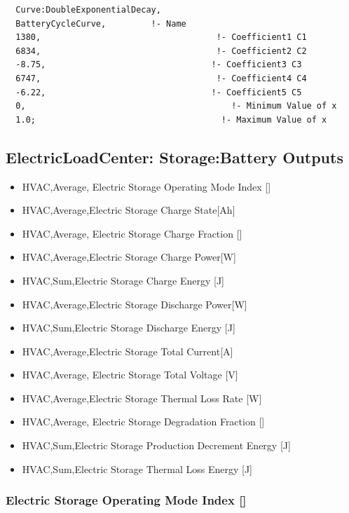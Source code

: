 \begin{lstlisting}
  Curve:DoubleExponentialDecay,
  BatteryCycleCurve,         !- Name
  1380,                                   !- Coefficient1 C1
  6834,                                   !- Coefficient2 C2
  -8.75,                                 !- Coefficient3 C3
  6747,                                   !- Coefficient4 C4
  -6.22,                                 !- Coefficient5 C5
  0,                                         !- Minimum Value of x
  1.0;                                     !- Maximum Value of x
\end{lstlisting}

\subsection{ElectricLoadCenter: Storage:Battery Outputs}\label{electricloadcenter-storagebattery-outputs}

\begin{itemize}
\item
  HVAC,Average, Electric Storage Operating Mode Index {[]}
\item
  HVAC,Average,Electric Storage Charge State{[}Ah{]}
\item
  HVAC,Average, Electric Storage Charge Fraction {[]}
\item
  HVAC,Average,Electric Storage Charge Power{[}W{]}
\item
  HVAC,Sum,Electric Storage Charge Energy {[}J{]}
\item
  HVAC,Average,Electric Storage Discharge Power{[}W{]}
\item
  HVAC,Sum,Electric Storage Discharge Energy {[}J{]}
\item
  HVAC,Average,Electric Storage Total Current{[}A{]}
\item
  HVAC,Average, Electric Storage Total Voltage {[}V{]}
\item
  HVAC,Average,Electric Storage Thermal Loss Rate {[}W{]}
\item
  HVAC,Average, Electric Storage Degradation Fraction {[]}
\item
  HVAC,Sum,Electric Storage Production Decrement Energy {[}J{]}
\item
  HVAC,Sum,Electric Storage Thermal Loss Energy {[}J{]}
\end{itemize}

\subsubsection{\texorpdfstring{Electric Storage Operating Mode Index {[]}}{Electric Storage Operating Mode Index }}\label{electric-storage-operating-mode-index}

